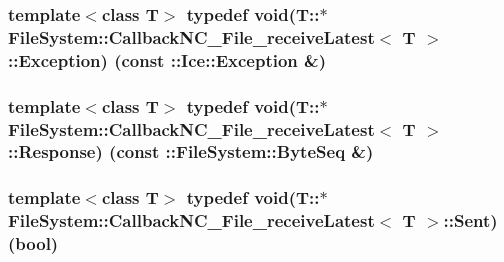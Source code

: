 \subsubsection[{Exception}]{\setlength{\rightskip}{0pt plus 5cm}template$<$class T$>$ typedef void(T\+::$\ast$ {\bf File\+System\+::\+Callback\+N\+C\+\_\+\+File\+\_\+receive\+Latest}$<$ T $>$\+::Exception) (const \+::Ice\+::\+Exception \&)}\label{class_file_system_1_1_callback_n_c___file__receive_latest_ab30d613e7021d1b46736b1249e24dd79}
\hypertarget{class_file_system_1_1_callback_n_c___file__receive_latest_afca5ede809f5485e6ef8d045e910dbed}{}
\subsubsection[{Response}]{\setlength{\rightskip}{0pt plus 5cm}template$<$class T$>$ typedef void(T\+::$\ast$ {\bf File\+System\+::\+Callback\+N\+C\+\_\+\+File\+\_\+receive\+Latest}$<$ T $>$\+::Response) (const \+::{\bf File\+System\+::\+Byte\+Seq} \&)}\label{class_file_system_1_1_callback_n_c___file__receive_latest_afca5ede809f5485e6ef8d045e910dbed}
\hypertarget{class_file_system_1_1_callback_n_c___file__receive_latest_a5eb8166c1545749bdf317b280f2aff67}{}
\subsubsection[{Sent}]{\setlength{\rightskip}{0pt plus 5cm}template$<$class T$>$ typedef void(T\+::$\ast$ {\bf File\+System\+::\+Callback\+N\+C\+\_\+\+File\+\_\+receive\+Latest}$<$ T $>$\+::Sent) (bool)}\label{class_file_system_1_1_callback_n_c___file__receive_latest_a5eb8166c1545749bdf317b280f2aff67}
\hypertarget{class_file_system_1_1_callback_n_c___file__receive_latest_afbae5443c9515ea0676fd1201dd9eb20}{}
